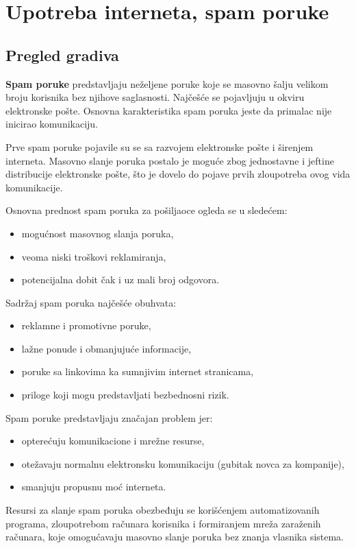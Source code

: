 \documentclass[a4paper, 12pt]{article}
\begin{document}
\section{Upotreba interneta, spam poruke}
\subsection{Pregled gradiva}
\textbf{Spam poruke} predstavljaju neželjene poruke koje se masovno šalju velikom broju
korisnika bez njihove saglasnosti. Najčešće se pojavljuju u okviru elektronske
pošte. Osnovna karakteristika spam poruka jeste da primalac nije inicirao komunikaciju.

Prve spam poruke pojavile su se sa razvojem elektronske pošte i širenjem interneta.
Masovno slanje poruka postalo je moguće zbog jednostavne i jeftine distribucije
elektronske pošte, što je dovelo do pojave prvih zloupotreba ovog vida komunikacije.

Osnovna prednost spam poruka za pošiljaoce ogleda se u sledećem:
\begin{itemize}
    \item mogućnost masovnog slanja poruka,
    \item veoma niski troškovi reklamiranja,
    \item potencijalna dobit čak i uz mali broj odgovora.
\end{itemize}

Sadržaj spam poruka najčešće obuhvata:
\begin{itemize}
    \item reklamne i promotivne poruke,
    \item lažne ponude i obmanjujuće informacije,
    \item poruke sa linkovima ka sumnjivim internet stranicama,
    \item priloge koji mogu predstavljati bezbednosni rizik.
\end{itemize}

Spam poruke predstavljaju značajan problem jer:
\begin{itemize}
    \item opterećuju komunikacione i mrežne resurse,
    \item otežavaju normalnu elektronsku komunikaciju (gubitak novca za kompanije),
    \item smanjuju propusnu moć interneta.
\end{itemize}

Resursi za slanje spam poruka obezbeđuju se korišćenjem automatizovanih programa,
zloupotrebom računara korisnika i formiranjem mreža zaraženih računara, koje
omogućavaju masovno slanje poruka bez znanja vlasnika sistema.
\end{document}
